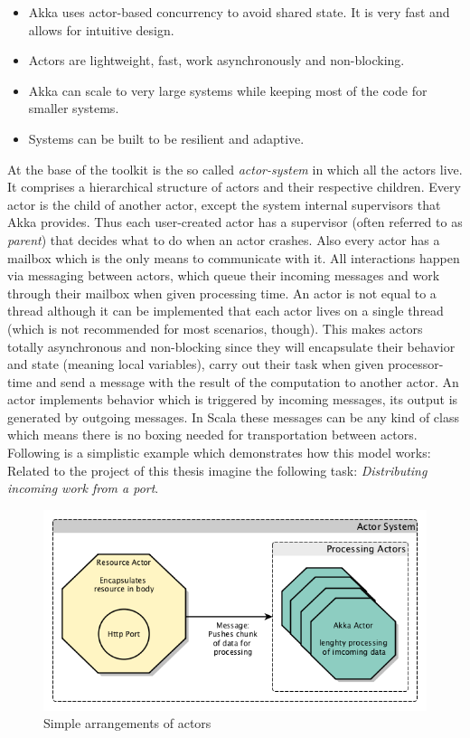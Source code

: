 \documentclass[twoside, 11pt]{scrartcl}
\begin{document}
\begin{itemize}
	\item Akka uses actor-based concurrency to avoid shared state. It is very fast and allows for intuitive design.
	\item Actors are lightweight, fast, work asynchronously and non-blocking.
	\item Akka can scale to very large systems while keeping most of the code for smaller systems.
	\item Systems can be built to be resilient and adaptive.
\end{itemize}

At the base of the toolkit is the so called  \textit{actor-system} in which all the actors live. It comprises a hierarchical structure of actors and their respective children. Every actor is the child of another actor, except the system internal supervisors that Akka provides. Thus each user-created actor has a supervisor (often referred to as \textit{parent}) that decides what to do when an actor crashes. Also every actor has a mailbox which is the only means to communicate with it. All interactions happen via messaging between actors, which queue their incoming messages and work through their mailbox when given processing time. An actor is not equal to a thread although it can be implemented that each actor lives on a single thread (which is not recommended for most scenarios, though).
This makes actors totally asynchronous and non-blocking since they will encapsulate their behavior and state (meaning local variables), carry out their task when given processor-time and send a message with the result of the computation to another actor. An actor implements behavior which is triggered by incoming messages, its output is generated by outgoing messages. In Scala these messages can be any kind of class which means there is no boxing needed for transportation between actors.\\

Following is a simplistic example which demonstrates how this model works:\\
Related to the project of this thesis imagine the following task: \textit{Distributing incoming work from a port}.

\begin{figure}[h]		
 	\includegraphics[scale=0.4]{figures/akkaExample1.png}
	\caption{Simple arrangements of actors}
	\label{fig:akkaExample1}
\end{figure}
\end{document}
